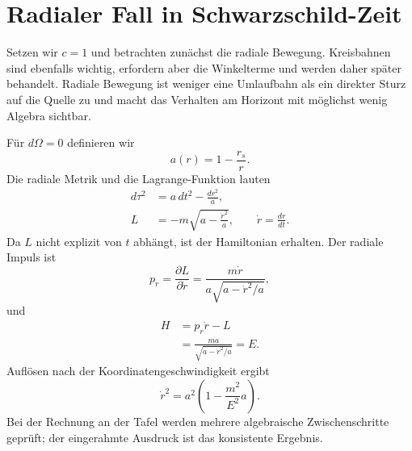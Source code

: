 \section{Radialer Fall in Schwarzschild-Zeit}

Setzen wir \(c=1\) und betrachten zunächst die radiale Bewegung. Kreisbahnen sind ebenfalls wichtig, erfordern aber die Winkelterme und werden daher später behandelt. Radiale Bewegung ist weniger eine Umlaufbahn als ein direkter Sturz auf die Quelle zu und macht das Verhalten am Horizont mit möglichst wenig Algebra sichtbar.

\begin{classroomqa}
\end{classroomqa}

Für \(d\Omega=0\) definieren wir
\begin{equation}
a(r)=1-\frac{r_s}{r}.
\label{eq:l5-a-def}
\end{equation}
Die radiale Metrik und die Lagrange-Funktion lauten
\begin{align}
d\tau^2&=a\,dt^2-\frac{dr^2}{a},\\
L&=-m\sqrt{a-\frac{\dot r^2}{a}},
\qquad
\dot r=\frac{dr}{dt}.
\label{eq:l5-radial-lagrangian}
\end{align}
Da \(L\) nicht explizit von \(t\) abhängt, ist der Hamiltonian erhalten. Der radiale Impuls ist
\begin{equation}
p_r=\frac{\partial L}{\partial\dot r}
=\frac{m\dot r}{a\sqrt{a-\dot r^2/a}},
\label{eq:l5-radial-momentum}
\end{equation}
und
\begin{align}
H
&=p_r\dot r-L\\
&=\frac{ma}{\sqrt{a-\dot r^2/a}}
=E.
\label{eq:l5-radial-energy}
\end{align}
Auflösen nach der Koordinatengeschwindigkeit ergibt
\begin{equation}
\boxed{
\dot r^2
=a^2\left(1-\frac{m^2}{E^2}a\right).
}
\label{eq:l5-radial-velocity}
\end{equation}
Bei der Rechnung an der Tafel werden mehrere algebraische Zwischenschritte geprüft; der eingerahmte Ausdruck ist das konsistente Ergebnis.


